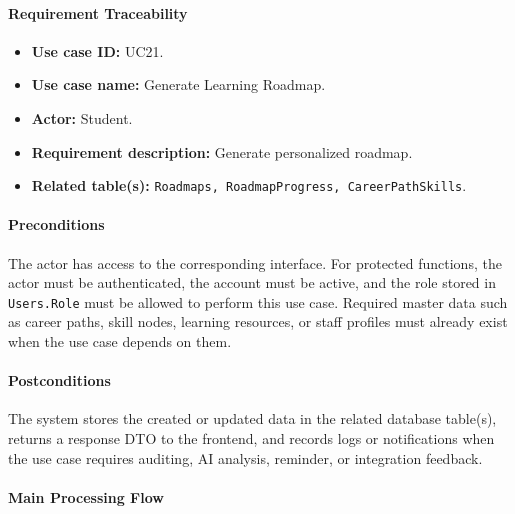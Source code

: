 \paragraph{Requirement Traceability}

\begin{itemize}
    \item \textbf{Use case ID:} UC21.
    \item \textbf{Use case name:} Generate Learning Roadmap.
    \item \textbf{Actor:} Student.
    \item \textbf{Requirement description:} Generate personalized roadmap.
    \item \textbf{Related table(s):} \texttt{Roadmaps, RoadmapProgress, CareerPathSkills}.
\end{itemize}

\paragraph{Preconditions}

The actor has access to the corresponding interface. For protected functions, the actor must be authenticated, the account must be active, and the role stored in \texttt{Users.Role} must be allowed to perform this use case. Required master data such as career paths, skill nodes, learning resources, or staff profiles must already exist when the use case depends on them.

\paragraph{Postconditions}

The system stores the created or updated data in the related database table(s), returns a response DTO to the frontend, and records logs or notifications when the use case requires auditing, AI analysis, reminder, or integration feedback.

\paragraph{Main Processing Flow}

